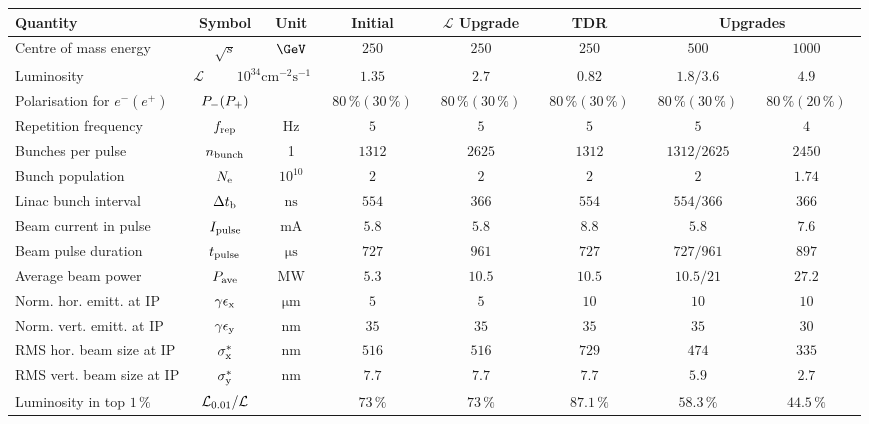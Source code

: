 \begin{table}[tbhp]
\begin{adjustbox}{width=1.\textwidth,center=\textwidth}
\begin{tabular}{lccccccc}
Quantity & Symbol & Unit & Initial & ${\mathcal{L}}$ Upgrade & TDR &  \multicolumn{2}{c}{Upgrades} \\
\hline
Centre of mass energy & $\sqrt{s}$ & ${\mathrm{\GeV}}$ & $250$ & $250$ & $250$ & $500$ & $1000$ \\
Luminosity & \multicolumn{2}{c}{${\mathcal{L}}$ ~~~~$10^{34}{\mathrm{cm^{-2}s^{-1}}}$} & $1.35$ & $2.7$ & $0.82$ & $1.8 / 3.6$ & $4.9$ \\
Polarisation for $e^- (e^+)$ & $P_{\mathrm{-}} (P_{\mathrm{+}})$ & & ~$80\,\% (30\,\%)$~ &  ~$80\,\% (30\,\%)$~ &  ~$80\,\% (30\,\%)$~ &~$80\,\% (30\,\%)$~ &  ~$80\,\% (20\,\%)$~  \\
Repetition frequency &$f_{\mathrm{{rep}}}$ & ${\mathrm{Hz}}$  & $5$ & $5$ & $5$ & $5$ & $4$ \\
Bunches per pulse  &$n_{\mathrm{{bunch}}}$ & 1  & $1312$ & $2625$ & $1312$ & $1312 / 2625$ & $2450$ \\
Bunch population  &$N_{\mathrm{{e}}}$ & $10^{10}$ & $2$ &  $2$ & $2$ & $2$ & $1.74$ \\
Linac bunch interval & $\Delta t_{\mathrm{{b}}}$ & ${\mathrm{ns}}$ & $554$ & $366$ & $554$ & $554 / 366$ & $366$ \\
Beam current in pulse & $I_{\mathrm{{pulse}}}$ & ${\mathrm{mA}}$& $5.8$ & $5.8$& $8.8$ & $5.8$ & $7.6$  \\
Beam pulse duration  & $t_{\mathrm{{pulse}}}$ & ${\mathrm{\mu s}}$ & $727$ & $961$ & $727$ & $727 / 961$ & $897$ \\
Average beam power  & $P_{\mathrm{{ave}}}$   & ${\mathrm{MW}}$ & $5.3$ & $10.5$ & $10.5$ & $10.5 / 21$  & $27.2$ \\  
Norm. hor. emitt. at IP & $\gamma\epsilon_{\mathrm{{x}}}$ & ${\mathrm{\mu m}}$& $5$ & $5$ & $10$ & $10$ & $10$  \\ 
Norm. vert. emitt. at IP & $\gamma\epsilon_{\mathrm{{y}}}$ & ${\mathrm{nm}}$ & $35$ & $35$ & $35$ & $35$ & $30$ \\ 
RMS hor. beam size at IP  & $\sigma^*_{\mathrm{{x}}}$ & ${\mathrm{nm}}$  & $516$ & $516$ & $729$ & $474$ & $335$ \\
RMS vert. beam size at IP &$\sigma^*_{\mathrm{{y}}}$ & ${\mathrm{nm}}$ & $7.7$  & $7.7$  & $7.7$  & $5.9$ & $2.7$ \\
Luminosity in top $1\,\%$ & ${\mathcal{L}}_{\mathrm{0.01}} / {\mathcal{L}}$ &  & $73\,\%$  &  $73\,\%$ & $87.1\,\%$  & $58.3\,\%$ & $44.5\,\%$\\

\end{tabular}
\end{adjustbox}
\end{table}
